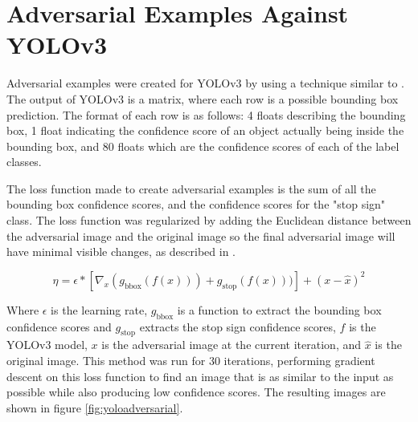 \documentclass{article}
\begin{document}
\section{Adversarial Examples Against YOLOv3}

Adversarial examples were created for YOLOv3 \cite{redmon2018yolov3} by using a technique similar to \cite{goodfellow2015explaining}. The output of YOLOv3 is a matrix, where each row is a possible bounding box prediction. The format of each row is as follows: 4 floats describing the bounding box, 1 float indicating the confidence score of an object actually being inside the bounding box, and 80 floats which are the confidence scores of each of the label classes.

The loss function made to create adversarial examples is the sum of all the bounding box confidence scores, and the confidence scores for the "stop sign" class. The loss function was regularized by adding the Euclidean distance between the adversarial image and the original image so the final adversarial image will have minimal visible changes, as described in \cite{szegedy2014intriguing}.

\begin{equation}
    \eta = \epsilon * [\nabla_{x} (g_{\text{bbox}}(f(x))) + g_{\text{stop}}(f(x)))] + (x - \hat{x})^2
\end{equation}

Where $\epsilon$ is the learning rate, $g_{\text{bbox}}$ is a function to extract the bounding box confidence scores and $g_{\text{stop}}$ extracts the stop sign confidence scores, $f$ is the YOLOv3 model, $x$ is the adversarial image at the current iteration, and $\hat{x}$ is the original image. This method was run for 30 iterations, performing gradient descent on this loss function to find an image that is as similar to the input as possible while also producing low confidence scores. The resulting images are shown in figure \ref{fig:yoloadversarial}.
\end{document}
